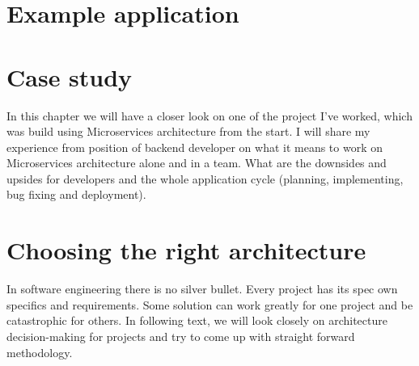 




\chapter{Example application}


\chapter{Case study}
\label{chapter:personal_experience}
In this chapter we will have a closer look on one of the project I've worked, which was build using Microservices architecture from the start. I will share my experience from position of backend developer on what it means to work on Microservices architecture alone and in a team. What are the downsides and upsides for developers and the whole application cycle (planning, implementing, bug fixing and deployment).



\chapter{Choosing the right architecture}
In software engineering there is no silver bullet. Every project has its spec own specifics and requirements. Some solution can work greatly for one project and be catastrophic for others. In following text, we will look closely on architecture decision-making for projects and try to come up with straight forward methodology.

% 